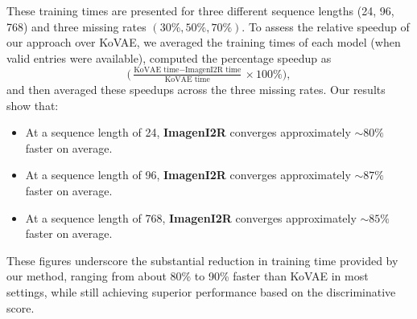 \documentclass{article}
\theoremstyle{plain}
\theoremstyle{definition}
\theoremstyle{remark}
\begin{document}
These training times are presented for three different sequence lengths (24, 96, 768) and three missing rates $(30\%, 50\%, 70\%)$. To assess the relative speedup of our approach over KoVAE, we averaged the training times of each model (when valid entries were available), computed the percentage speedup as 
\[
  \bigl(\tfrac{\text{KoVAE time} - \text{ImagenI2R time}}{\text{KoVAE time}} \times 100\%\bigr),
\]
and then averaged these speedups across the three missing rates. Our results show that:
\begin{itemize}
    \item At a sequence length of 24, \textbf{ImagenI2R} converges approximately \(\sim80\%\) faster on average.
    \item At a sequence length of 96, \textbf{ImagenI2R} converges approximately \(\sim87\%\) faster on average.
    \item At a sequence length of 768, \textbf{ImagenI2R} converges approximately \(\sim85\%\) faster on average.
\end{itemize}

These figures underscore the substantial reduction in training time provided by our method, ranging from about 80\% to 90\% faster than KoVAE in most settings, while still achieving superior performance based on the discriminative score. 
\end{document}
